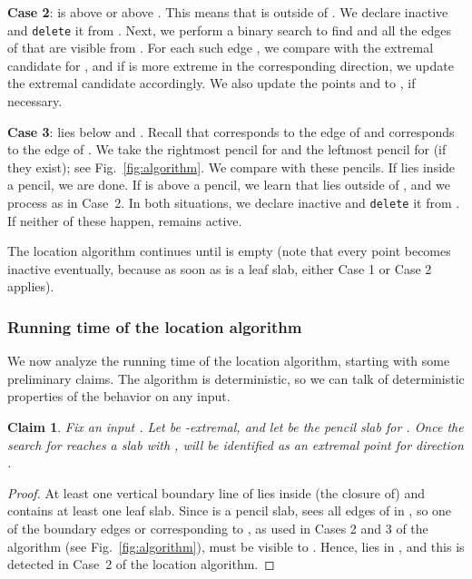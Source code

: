 \documentclass[letterpaper,11pt]{article}
\newtheorem{claim}[theorem]{Claim}
\newcommand{\delete}{\texttt{delete}}
\begin{document}
\noindent\textbf{Case 2}:  
 is above  or above . 
This means that  is outside of .  
We declare  inactive and
\delete{} it from . Next, we 
perform a binary search to find 
 and all the edges of 
 that are visible 
from . For each such edge ,
we compare  with the extremal 
candidate for , and if  is more 
extreme in the corresponding direction, 
we update the extremal candidate accordingly. 
We also update the points  and 
 to , if necessary. 

\noindent\textbf{Case 3}:  lies 
below  and . Recall that
 corresponds to the edge  of 
 and  corresponds to the 
edge  of . We take the rightmost 
pencil for  and the leftmost pencil for  
(if they exist); see Fig.~\ref{fig:algorithm}.
We compare  with these pencils. 
If  lies inside a pencil, we are done.
If  is above a pencil, we learn 
that  lies outside of , and we 
process as in Case~2. In both situations, 
we declare  inactive and \delete{} it 
from . 
If neither of these happen,  remains active.

The location algorithm continues until  is 
empty (note that every point becomes inactive 
eventually, because as soon as  is a leaf
slab, either Case 1 or Case 2 applies).


\subsubsection{Running time of the location algorithm}

We now analyze the running time of 
the location algorithm, starting
with some preliminary claims.
The algorithm is deterministic, so 
we can talk of deterministic 
properties of the behavior on any input.

\begin{claim}\label{clm:algoext} 
  Fix an input . Let
   be -extremal,
  and let  be the pencil
  slab for . Once the 
  search for  reaches a slab  
  with , 
   will be identified as an extremal point 
  for direction .
\end{claim}

\begin{proof} 
At least one vertical boundary 
line of  lies inside (the 
closure of)  and 
 contains at least 
one leaf slab. Since  is a 
pencil slab,  sees all edges 
of  in , so one of 
the boundary edges  or  
corresponding to , as used in 
Cases 2 and 3 of the algorithm 
(see Fig.~\ref{fig:algorithm}), must
be visible to . 
Hence,  lies in 
, and
this is detected in Case~2 
of the location algorithm.
\end{proof}
\end{document}
